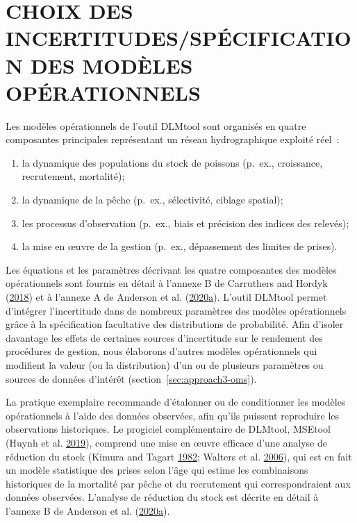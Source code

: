\documentclass[11pt]{book}
\begin{document}
\frontmatter

\hypertarget{sec:om}{%
\section{CHOIX DES INCERTITUDES/SPÉCIFICATION DES MODÈLES OPÉRATIONNELS}\label{sec:om}}

Les modèles opérationnels de l'outil DLMtool sont organisés en quatre composantes principales représentant un réseau hydrographique exploité réel~:
\begin{enumerate}
\def\labelenumi{\arabic{enumi}.}

\item
  la dynamique des populations du stock de poissons (p.~ex., croissance, recrutement, mortalité);
\item
  la dynamique de la pêche (p.~ex., sélectivité, ciblage spatial);
\item
  les processus d'observation (p.~ex., biais et précision des indices des relevés);
\item
  la mise en œuvre de la gestion (p.~ex., dépassement des limites de prises).
\end{enumerate}
Les équations et les paramètres décrivant les quatre composantes des modèles opérationnels sont fournis en détail à l'annexe B de Carruthers and Hordyk (\protect\hyperlink{ref-carruthers2018}{2018}) et à l'annexe A de Anderson et al. (\protect\hyperlink{ref-anderson2020gfmp}{2020}\protect\hyperlink{ref-anderson2020gfmp}{a}). L'outil DLMtool permet d'intégrer l'incertitude dans de nombreux paramètres des modèles opérationnels grâce à la spécification facultative des distributions de probabilité. Afin d'isoler davantage les effets de certaines sources d'incertitude sur le rendement des procédures de gestion, nous élaborons d'autres modèles opérationnels qui modifient la valeur (ou la distribution) d'un ou de plusieurs paramètres ou sources de données d'intérêt (section~\ref{sec:approach3-oms}).

La pratique exemplaire recommande d'étalonner ou de conditionner les modèles opérationnels à l'aide des données observées, afin qu'ils puissent reproduire les observations historiques. Le progiciel complémentaire de DLMtool, MSEtool (Huynh et al. \protect\hyperlink{ref-huynh_msetool_2019}{2019}), comprend une mise en œuvre efficace d'une analyse de réduction du stock (Kimura and Tagart \protect\hyperlink{ref-kimura1982}{1982}; Walters et al. \protect\hyperlink{ref-walters2006}{2006}), qui est en fait un modèle statistique des prises selon l'âge qui estime les combinaisons historiques de la mortalité par pêche et du recrutement qui correspondraient aux données observées. L'analyse de réduction du stock est décrite en détail à l'annexe B de Anderson et al. (\protect\hyperlink{ref-anderson2020gfmp}{2020}\protect\hyperlink{ref-anderson2020gfmp}{a}).
\end{document}
